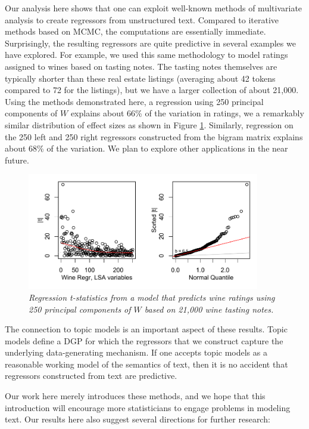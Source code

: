 \documentclass[12pt]{article}
\begin{document}
 Our analysis here shows that one can exploit well-known methods of multivariate analysis to create regressors from unstructured text.  Compared to iterative methods based on MCMC, the computations are essentially immediate.  Surprisingly, the resulting regressors are quite predictive in several examples we have explored.  For example, we used this same methodology to model ratings assigned to wines based on tasting notes.  The tasting notes themselves are typically shorter than these real estate listings (averaging about 42 tokens compared to 72 for the listings), but we have a larger collection of about 21,000.  Using the methods demonstrated here, a regression using 250 principal components of $W$ explains about 66\% of the variation in ratings, we a remarkably similar distribution of effect sizes as shown in Figure \ref{fig:wine}.  Similarly, regression on the 250 left and 250 right regressors constructed from the bigram matrix explains about 68\% of the variation.  We plan to explore other applications in the near future.
 
 
 \begin{figure}
 \caption{ \label{fig:wine} \sl Regression t-statistics from a model that predicts wine ratings using 250 principal components of $W$ based on 21,000 wine tasting notes.}
 
 \centerline{
   \includegraphics[width=4in]{figures/wine.pdf}
   }
  \end{figure} 
  
  
   The connection to topic models is an important aspect of these results.  Topic models define a DGP for which the regressors that we construct capture the underlying data-generating mechanism.  If one accepts topic models as a reasonable working model of the semantics of text, then it is no accident that regressors constructed from text are predictive.


 Our work here merely introduces these methods, and we hope that this introduction will encourage more statisticians to engage problems in  modeling text.  Our results here also suggest several directions for further research:
\end{document}
